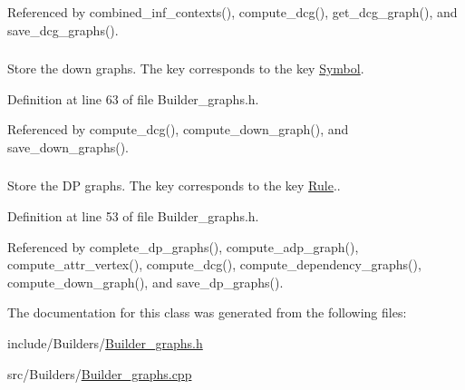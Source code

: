 Referenced by combined\_\-inf\_\-contexts(), compute\_\-dcg(), get\_\-dcg\_\-graph(), and save\_\-dcg\_\-graphs().\hypertarget{classgenevalmag_1_1Builder__graphs_05fcf30d7286884794303103544979c4}{
\subsubsection[{p\_\-Down\_\-graphs}]{}}
\label{classgenevalmag_1_1Builder__graphs_05fcf30d7286884794303103544979c4}


Store the down graphs. The key corresponds to the key \hyperlink{classgenevalmag_1_1Symbol}{Symbol}. 



Definition at line 63 of file Builder\_\-graphs.h.

Referenced by compute\_\-dcg(), compute\_\-down\_\-graph(), and save\_\-down\_\-graphs().\hypertarget{classgenevalmag_1_1Builder__graphs_2f001cd797840683731d524214cd6d13}{
\subsubsection[{p\_\-Dp\_\-graphs}]{}}
\label{classgenevalmag_1_1Builder__graphs_2f001cd797840683731d524214cd6d13}


Store the DP graphs. The key corresponds to the key \hyperlink{classgenevalmag_1_1Rule}{Rule}.. 



Definition at line 53 of file Builder\_\-graphs.h.

Referenced by complete\_\-dp\_\-graphs(), compute\_\-adp\_\-graph(), compute\_\-attr\_\-vertex(), compute\_\-dcg(), compute\_\-dependency\_\-graphs(), compute\_\-down\_\-graph(), and save\_\-dp\_\-graphs().

The documentation for this class was generated from the following files:\begin{CompactItemize}
\item 
include/Builders/\hyperlink{Builder__graphs_8h}{Builder\_\-graphs.h}\item 
src/Builders/\hyperlink{Builder__graphs_8cpp}{Builder\_\-graphs.cpp}\end{CompactItemize}
